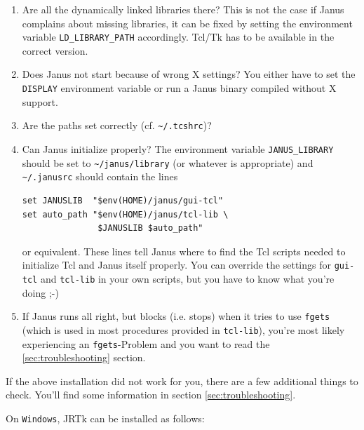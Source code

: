 \documentclass[a4paper,twoside]{book}
\begin{document}
  \begin{enumerate}
    \item Are all the dynamically linked libraries there?
      This is not the case if Janus complains about missing libraries, it
      can be fixed by setting the environment variable
      \texttt{LD\_LIBRARY\_PATH} accordingly. Tcl/Tk has to be available
      in the correct version.
    \item Does Janus not start because of wrong X settings? You either
      have to set the \texttt{DISPLAY} environment variable or run a
      Janus binary compiled without X support.
    \item Are the paths set correctly (cf. \texttt{\~{ }/.tcshrc})?
    \item Can Janus initialize properly? The environment variable
      \texttt{JANUS\_LIBRARY} should be set to
      \texttt{\~{ }/janus/library} (or whatever is appropriate)
      and \texttt{\~{ }/.janusrc} should contain the lines 
      \begin{verbatim}
set JANUSLIB  "$env(HOME)/janus/gui-tcl"
set auto_path "$env(HOME)/janus/tcl-lib \
               $JANUSLIB $auto_path"
      \end{verbatim}
      or equivalent.
      These lines tell Janus where to find the Tcl scripts needed to
      initialize Tcl and Janus itself properly. You can override the
      settings for \texttt{gui-tcl} and \texttt{tcl-lib} in your own
      scripts, but you have to know what you're doing ;-)
    \item If Janus runs all right, but blocks (i.e. stops) when it tries to use
      \texttt{fgets} (which is used in most procedures provided in
      \texttt{tcl-lib}), you're most likely experiencing an
      \texttt{fgets}-Problem and you want to read the \ref{sec:troubleshooting}
      section.

\end{enumerate}

If the   above installation did  not work   for you,  there  are a few
additional  things to check. You'll find   some information in section
\ref{sec:troubleshooting}.

On \texttt{Windows}, JRTk can be installed as follows:
\end{document}
